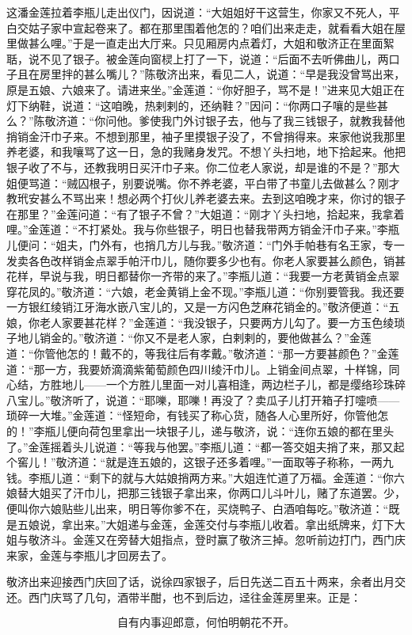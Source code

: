 这潘金莲拉着李瓶儿走出仪门，因说道：“大姐姐好干这营生，你家又不死人，平白交姑子家中宣起卷来了。都在那里围着他怎的？咱们出来走走，就看看大姐在屋里做甚么哩。”于是一直走出大厅来。只见厢房内点着灯，大姐和敬济正在里面絮聒，说不见了银子。被金莲向窗棂上打了一下，说道：“后面不去听佛曲儿，两口子且在房里拌的甚么嘴儿？”陈敬济出来，看见二人，说道：“早是我没曾骂出来，原是五娘、六娘来了。请进来坐。”金莲道：“你好胆子，骂不是！”进来见大姐正在灯下纳鞋，说道：“这咱晚，热剌剌的，还纳鞋？”因问：“你两口子嚷的是些甚么？”陈敬济道：“你问他。爹使我门外讨银子去，他与了我三钱银子，就教我替他捎销金汗巾子来。不想到那里，袖子里摸银子没了，不曾捎得来。来家他说我那里养老婆，和我嚷骂了这一日，急的我赌身发咒。不想丫头扫地，地下拾起来。他把银子收了不与，还教我明日买汗巾子来。你二位老人家说，却是谁的不是？”那大姐便骂道：“贼囚根子，别要说嘴。你不养老婆，平白带了书童儿去做甚么？刚才教玳安甚么不骂出来！想必两个打伙儿养老婆去来。去到这咱晚才来，你讨的银子在那里？”金莲问道：“有了银子不曾？”大姐道：“刚才丫头扫地，拾起来，我拿着哩。”金莲道：“不打紧处。我与你些银子，明日也替我带两方销金汗巾子来。”李瓶儿便问：“姐夫，门外有，也捎几方儿与我。”敬济道：“门外手帕巷有名王家，专一发卖各色改样销金点翠手帕汗巾儿，随你要多少也有。你老人家要甚么颜色，销甚花样，早说与我，明日都替你一齐带的来了。”李瓶儿道：“我要一方老黄销金点翠穿花凤的。”敬济道：“六娘，老金黄销上金不现。”李瓶儿道：“你别要管我。我还要一方银红绫销江牙海水嵌八宝儿的，又是一方闪色芝麻花销金的。”敬济便道：“五娘，你老人家要甚花样？”金莲道：“我没银子，只要两方儿勾了。要一方玉色绫琐子地儿销金的。”敬济道：“你又不是老人家，白剌剌的，要他做甚么？”金莲道：“你管他怎的！戴不的，等我往后有孝戴。”敬济道：“那一方要甚颜色？”金莲道：“那一方，我要娇滴滴紫葡萄颜色四川绫汗巾儿。上销金间点翠，十样锦，同心结，方胜地儿——一个方胜儿里面一对儿喜相逢，两边栏子儿，都是缨络珍珠碎八宝儿。”敬济听了，说道：“耶嚛，耶嚛！再没了？卖瓜子儿打开箱子打嚏喷——琐碎一大堆。”金莲道：“怪短命，有钱买了称心货，随各人心里所好，你管他怎的！”李瓶儿便向荷包里拿出一块银子儿，递与敬济，说：“连你五娘的都在里头了。”金莲摇着头儿说道：“等我与他罢。”李瓶儿道：“都一答交姐夫捎了来，那又起个窖儿！”敬济道：“就是连五娘的，这银子还多着哩。”一面取等子称称，一两九钱。李瓶儿道：“剩下的就与大姑娘捎两方来。”大姐连忙道了万福。金莲道：“你六娘替大姐买了汗巾儿，把那三钱银子拿出来，你两口儿斗叶儿，赌了东道罢。少，便叫你六娘贴些儿出来，明日等你爹不在，买烧鸭子、白酒咱每吃。”敬济道：“既是五娘说，拿出来。”大姐递与金莲，金莲交付与李瓶儿收着。拿出纸牌来，灯下大姐与敬济斗。金莲又在旁替大姐指点，登时赢了敬济三掉。忽听前边打门，西门庆来家，金莲与李瓶儿才回房去了。

敬济出来迎接西门庆回了话，说徐四家银子，后日先送二百五十两来，余者出月交还。西门庆骂了几句，酒带半酣，也不到后边，迳往金莲房里来。正是：

\[
自有内事迎郎意，何怕明朝花不开。
\]

